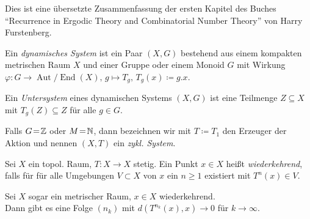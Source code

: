 \documentclass{cheat-sheet}
\DeclareMathOperator{\Aut}{Aut} %
\DeclareMathOperator{\End}{End} %
\newcommand{\AutEnd}{\Aut\!/\!\End} %
\begin{document}


Dies ist eine übersetzte Zusammenfassung der ersten Kapitel des Buches "`Recurrence in Ergodic Theory and Combinatorial Number Theory"' von Harry Furstenberg.



\begin{defn}
  Ein \emph{dynamisches System} ist ein Paar $(X, G)$ bestehend aus einem kompakten metrischen Raum $X$ und einer Gruppe oder einem Monoid $G$ mit Wirkung
  $\varphi : G \to \AutEnd(X), \, g \mapsto T_g, \, T_g(x) \coloneqq g.x$.
\end{defn}

\begin{defn}
  Ein \emph{Untersystem} eines dynamischen Systems $(X, G)$ ist eine Teilmenge $Z \subseteq X$ mit $T_g(Z) \subseteq Z$ für alle $g \in G$.
\end{defn}

\begin{bem}
  Falls $G \!=\! \mathbb{Z}$ oder $M \!=\! \mathbb{N}$, dann bezeichnen wir mit $T \coloneqq T_1$ den Erzeuger der Aktion und nennen $(X, T)$ ein \emph{zykl. System}.
\end{bem}

\begin{defn}
  Sei $X$ ein topol. Raum, $T : X \to X$ stetig.
  Ein Punkt $x \in X$ heißt \emph{wiederkehrend}, falls für für alle Umgebungen $V \subset X$ von $x$ ein $n \geq 1$ existiert mit $T^n(x) \in V$.
\end{defn}

\begin{bem}
  Sei $X$ sogar ein metrischer Raum, $x \in X$ wiederkehrend. \\
  Dann gibt es eine Folge $(n_k)$ mit $d(T^{n_k}(x), x) \to 0$ für $k \to \infty$.
\end{bem}
\end{document}
